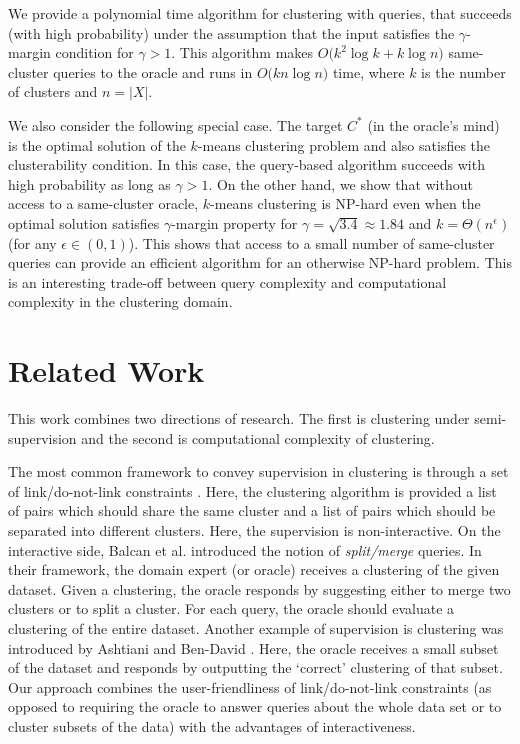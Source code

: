\documentclass[12pt]{article}
\begin{document}
We provide a polynomial time algorithm for clustering with queries, that succeeds (with high probability) under the assumption that the input satisfies the $\gamma$-margin condition for $\gamma > 1$. This algorithm makes $O\big(k^2\log k + k\log n)$ same-cluster queries to the oracle and runs in $O\big(kn\log n)$ time, where $k$ is the number of clusters and $n = |X|$.

We also consider the following special case. The target $C^*$ (in the oracle's mind) is the optimal solution of the $k$-means clustering problem and also satisfies the clusterability condition. In this case, the query-based algorithm succeeds with high probability as long as $\gamma >1$.  On the other hand, we show that without access to a same-cluster oracle, $k$-means clustering is NP-hard even when the optimal solution satisfies $\gamma$-margin property for $\gamma=\sqrt{3.4} \approx 1.84$ and $k=\Theta(n^\epsilon)$ (for any $\epsilon\in (0,1)$). This shows that access to a small number of same-cluster queries can provide an efficient algorithm for an otherwise NP-hard problem. This is an interesting trade-off between query complexity and computational complexity in the clustering domain. 

\section{Related Work}
This work combines two directions of research. The first is clustering under semi-supervision and the second is computational complexity of clustering. 

The most common framework to convey supervision in clustering is through a set of link/do-not-link constraints \cite{basu2002semi,basu2004probabilistic, kulis2009semi}. Here, the clustering algorithm is provided a list of pairs which should share the same cluster and a list of pairs which should be separated into different clusters. Here, the supervision is non-interactive. On the interactive side, Balcan et al. \cite{balcan2008clustering} introduced the notion of \textit{split/merge} queries. In their framework, the domain expert (or oracle) receives a clustering of the given dataset. Given a clustering, the oracle responds by suggesting either to merge two clusters or to split a cluster. For each query, the oracle should evaluate a clustering of the entire dataset. Another example of supervision is clustering was introduced by Ashtiani and Ben-David \cite{ashtiani2015representation}. Here, the oracle receives a small subset of the dataset and responds by outputting the `correct' clustering of that subset. Our approach combines the user-friendliness of link/do-not-link constraints (as opposed to requiring the oracle to answer queries about the whole data set or to cluster subsets of the data) with the advantages of interactiveness. 
\end{document}
